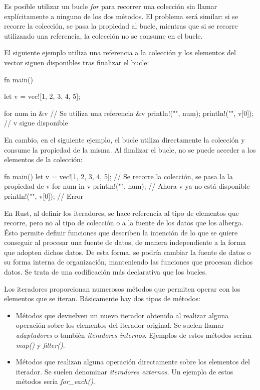 Es posible utilizar un bucle \textit{for} para recorrer una colección sin llamar explícitamente a ninguno de los dos métodos. El problema será similar: si se recorre la colección, se pasa la propiedad al bucle, mientras que si se recorre utilizando una referencia, la colección no se consume en el bucle. 

El siguiente ejemplo utiliza una referencia a la colección y los elementos del vector siguen disponibles tras finalizar el bucle:

\vspace{0.7em}
\begin{Codigo}
   fn main() {
      let v = vec![1, 2, 3, 4, 5];  
      
      for num in &v { // Se utiliza una referencia &v
         println!("{}", num);
      }
      println!("{}", v[0]); // v sigue disponible
   }
\end{Codigo}

En cambio, en el siguiente ejemplo, el bucle utiliza directamente la colección y consume la propiedad de la misma. Al finalizar el bucle, no se puede acceder a los elementos de la colección:

\vspace{0.7em}
\begin{Codigo}
   fn main() {
      let v = vec![1, 2, 3, 4, 5];      
      // Se recorre la colección, se pasa la la propiedad de v 
      for num in v {
         println!("{}", num);
      }
      // Ahora v ya no está disponible
      println!("{}", v[0]); // Error
   }
\end{Codigo}

En Rust, al definir los iteradores, se hace referencia al tipo de elementos que recorre, pero no al tipo de colección o a la fuente de los datos que los alberga. Ésto permite definir funciones que describen la intención de lo que se quiere conseguir al procesar una fuente de datos, de manera independiente a la forma que adopten dichos datos. De esta forma, se podría cambiar la fuente de datos o su forma interna de organización, manteniendo las funciones que procesan dichos datos. Se trata de una codificación más declarativa que los bucles.

Los iteradores proporcionan numerosos métodos que permiten operar con los elementos que se iteran. Básicamente hay dos tipos de métodos:

\begin{itemize}
   \item Métodos que devuelven un nuevo iterador obtenido al realizar alguna operación sobre los elementos del iterador original. Se suelen llamar \textit{adaptadores} o también \textit{iteradores internos}. Ejemplos de estos métodos serían \textit{map()} y \textit{filter()}.
   \item Métodos que realizan alguna operación directamente sobre los elementos del iterador. Se suelen denominar \textit{iteradores externos}. Un ejemplo de estos métodos sería \textit{for\_each()}. 
\end{itemize}

